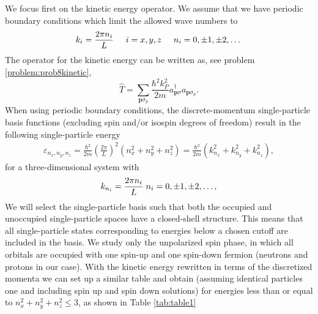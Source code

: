 We focus first on the kinetic energy operator.
We assume that we have periodic boundary conditions which limit the allowed wave numbers to
\[
k_i=\frac{2\pi n_i}{L}\hspace{0.5cm} i=x,y,z \hspace{0.5cm} n_i=0,\pm 1,\pm 2, \dots
\]
The operator for the kinetic energy can be written as, see problem \ref{problem:prob8kinetic},
\[
\hat{T}=\sum_{\mathbf{p}\sigma_p}\frac{\hbar^2k_P^2}{2m}a_{\mathbf{p}\sigma}^{\dagger}a_{\mathbf{p}\sigma_p}.
\]
When using periodic boundary conditions, the 
discrete-momentum single-particle basis functions (excluding spin and/or isospin degrees of freedom) 
result in 
the following single-particle energy 
\begin{align}
  \varepsilon_{n_{x}, n_{y}, n_{z}} = \frac{\hbar^{2}}{2m}
  \left( \frac{2\pi }{L}\right)^{2}
  \left( n_{x}^{2} + n_{y}^{2} + n_{z}^{2}\right)=\frac{\hbar^2}{2m}\left(k_{n_x}^2+k_{n_y}^2+k_{n_z}^2\right),
\end{align} 
for a three-dimensional system with 
\[
k_{n_i}=\frac{2\pi n_i}{L} \hspace{0.1cm} n_i = 0, \pm 1, \pm 2, \dots, 
\]
We will select  the single-particle basis such that both the occupied and 
unoccupied single-particle spaces have a closed-shell 
structure. This means that all single-particle states 
corresponding to energies below a chosen cutoff are
included in the basis. We study only the unpolarized spin
phase, in which all orbitals are occupied with one spin-up 
and one spin-down fermion (neutrons and protons in our case). 
With the kinetic energy rewritten in terms of the discretized momenta
we can set up a similar table and obtain (assuming identical particles one and including spin up and spin down solutions)  for energies less than or equal to $n_{x}^{2}+n_{y}^{2}+n_{z}^{2}\le 3$, as shown in Table \ref{tab:table1}
